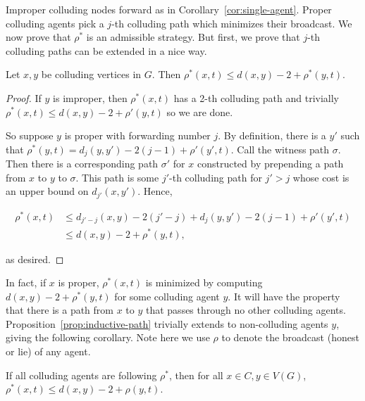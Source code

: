 \documentclass{comnet}
\begin{document}
Improper colluding nodes forward as in
Corollary~\ref{cor:single-agent}. Proper colluding agents pick a $j$-th
colluding path which minimizes their broadcast. We now prove
that $\rho^*$ is an admissible strategy. But first, we prove that $j$-th colluding paths can be extended in a
nice way.

\begin{proposition} \label{prop:inductive-path}

Let $x,y$ be colluding vertices in $G$. Then $\rho^*(x,t) \leq d(x,y) - 2 +
\rho^*(y,t)$.

\end{proposition}

\begin{proof}

If $y$ is improper, then $\rho^*(x,t)$ has a 2-th colluding path and trivially
$\rho^*(x,t) \leq d(x,y) - 2 + \rho'(y,t)$ so we are done.

So suppose $y$ is proper with forwarding number $j$. By definition, there is a
$y'$ such that $\rho^*(y,t) = d_j(y,y') - 2(j-1) + \rho'(y',t)$. Call the
witness path $\sigma$. Then there is a corresponding path $\sigma'$ for $x$
constructed by prepending a path from $x$ to $y$ to $\sigma$. This path is some
$j'$-th colluding path for $j' > j$ whose cost is an upper bound on
$d_{j'}(x,y')$.  Hence,

\begin{align*}
   \rho^*(x,t) &\leq d_{j'-j}(x,y) - 2(j' - j) + d_j(y,y') - 2(j-1) +
\rho'(y',t) \\
               &\leq d(x,y) - 2 + \rho^*(y,t),
\end{align*}

as desired.
\end{proof}

In fact, if $x$ is proper, $\rho^*(x,t)$ is minimized by computing $d(x,y) - 2
+ \rho^*(y,t)$ for some colluding agent $y$. It will have the property that
there is a path from $x$ to $y$ that passes through no other colluding agents.
Proposition~\ref{prop:inductive-path} trivially extends to non-colluding agents
$y$, giving the following corollary. Note here we use $\rho$ to denote the
broadcast (honest or lie) of any agent.

\begin{corollary} \label{cor:rhostar-bound}

If all colluding agents are following $\rho^*$, then for all $x \in C, y \in
V(G)$, $\rho^*(x,t) \leq d(x,y) - 2 + \rho(y,t)$.

\end{corollary}
\end{document}

